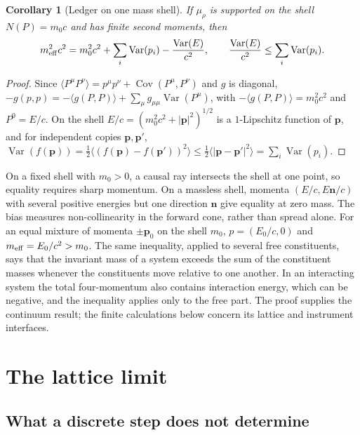 \documentclass[12pt,a4paper]{article}
\newtheorem{corollary}[theorem]{Corollary}
\theoremstyle{definition}
\theoremstyle{remark}
\begin{document}
\begin{corollary}[Ledger on one mass shell]
\label{cor:ledger}
If $\mu_\rho$ is supported on the shell $N(P)=m_0c$ and has finite second moments, then
\begin{equation}
m_{\rm eff}^2c^2=m_0^2c^2+\sum_i\operatorname{Var}(p_i)-\frac{\operatorname{Var}(E)}{c^2},\qquad \frac{\operatorname{Var}(E)}{c^2}\le\sum_i\operatorname{Var}(p_i).
\end{equation}
\end{corollary}

\begin{proof}
Since $\langle P^\mu P^\nu\rangle=p^\mu p^\nu+\operatorname{Cov}(P^\mu,P^\nu)$ and $g$ is diagonal, $-g(p,p)=-\langle g(P,P)\rangle+\sum_\mu g_{\mu\mu}\operatorname{Var}(P^\mu)$, with $-\langle g(P,P)\rangle=m_0^2c^2$ and $P^0=E/c$. On the shell $E/c=(m_0^2c^2+|\mathbf p|^2)^{1/2}$ is a $1$-Lipschitz function of $\mathbf p$, and for independent copies $\mathbf p,\mathbf p'$, $\operatorname{Var}(f(\mathbf p))=\tfrac12\langle(f(\mathbf p)-f(\mathbf p'))^2\rangle\le\tfrac12\langle|\mathbf p-\mathbf p'|^2\rangle=\sum_i\operatorname{Var}(p_i)$.
\end{proof}

On a fixed shell with $m_0>0$, a causal ray intersects the shell at one point, so equality requires sharp momentum. On a massless shell, momenta $(E/c,E\mathbf n/c)$ with several positive energies but one direction $\mathbf n$ give equality at zero mass. The bias measures non-collinearity in the forward cone, rather than spread alone. For an equal mixture of momenta $\pm\mathbf p_0$ on the shell $m_0$, $p=(E_0/c,0)$ and $m_{\rm eff}=E_0/c^2>m_0$. The same inequality, applied to several free constituents, says that the invariant mass of a system exceeds the sum of the constituent masses whenever the constituents move relative to one another. In an interacting system the total four-momentum also contains interaction energy, which can be negative, and the inequality applies only to the free part. The proof supplies the continuum result; the finite calculations below concern its lattice and instrument interfaces.

\section{The lattice limit}
\label{sec:lattice}

\subsection{What a discrete step does not determine}
\end{document}
